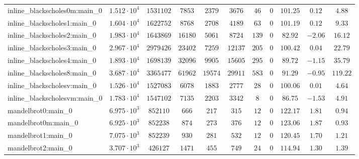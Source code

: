 \begin{tabular}{|l|c|c|c|c|c|c|c|c|c|c|}
inline\_blackscholes0m:main\_0 & $ 1.512 \cdot 10^{4} $ & $ 1531102  $ & $ 7853   $ & $ 2379   $ & $ 3676   $ & $ 46   $ & $ 0    $ & $ 101.25      $ & $ 0.12    $ & $ 4.88    $ \\
inline\_blackscholes1:main\_0  & $ 1.604 \cdot 10^{4} $ & $ 1622752  $ & $ 8768   $ & $ 2708   $ & $ 4189   $ & $ 63   $ & $ 0    $ & $ 101.19      $ & $ 0.12    $ & $ 9.33    $ \\
inline\_blackscholes2:main\_0  & $ 1.983 \cdot 10^{4} $ & $ 1643869  $ & $ 16180  $ & $ 5061   $ & $ 8724   $ & $ 139  $ & $ 0    $ & $ 82.92       $ & $ -2.06   $ & $ 16.12   $ \\
inline\_blackscholes3:main\_0  & $ 2.967 \cdot 10^{4} $ & $ 2979426  $ & $ 23402  $ & $ 7259   $ & $ 12137  $ & $ 205  $ & $ 0    $ & $ 100.42      $ & $ 0.04    $ & $ 22.79   $ \\
inline\_blackscholes4:main\_0  & $ 1.893 \cdot 10^{4} $ & $ 1698139  $ & $ 32096  $ & $ 9905   $ & $ 15605  $ & $ 295  $ & $ 0    $ & $ 89.72       $ & $ -1.15   $ & $ 35.79   $ \\
inline\_blackscholes8:main\_0  & $ 3.687 \cdot 10^{4} $ & $ 3365477  $ & $ 61962  $ & $ 19574  $ & $ 29911  $ & $ 583  $ & $ 0    $ & $ 91.29       $ & $ -0.95   $ & $ 119.22  $ \\
inline\_blackscholesv:main\_0  & $ 1.526 \cdot 10^{4} $ & $ 1527083  $ & $ 6078   $ & $ 1883   $ & $ 2777   $ & $ 28   $ & $ 0    $ & $ 100.06      $ & $ 0.01    $ & $ 4.64    $ \\
inline\_blackscholesvm:main\_0 & $ 1.783 \cdot 10^{4} $ & $ 1547102  $ & $ 7135   $ & $ 2203   $ & $ 3342   $ & $ 8    $ & $ 0    $ & $ 86.75       $ & $ -1.53   $ & $ 4.91    $ \\
mandelbrot0:main\_0            & $ 6.975 \cdot 10^{3} $ & $ 852110   $ & $ 666    $ & $ 217    $ & $ 315    $ & $ 12   $ & $ 0    $ & $ 122.17      $ & $ 1.81    $ & $ 0.94    $ \\
mandelbrot0m:main\_0           & $ 6.925 \cdot 10^{3} $ & $ 852238   $ & $ 874    $ & $ 273    $ & $ 376    $ & $ 12   $ & $ 0    $ & $ 123.06      $ & $ 1.87    $ & $ 0.93    $ \\
mandelbrot1:main\_0            & $ 7.075 \cdot 10^{3} $ & $ 852239   $ & $ 930    $ & $ 281    $ & $ 532    $ & $ 12   $ & $ 0    $ & $ 120.45      $ & $ 1.70    $ & $ 1.21    $ \\
mandelbrot2:main\_0            & $ 3.707 \cdot 10^{3} $ & $ 426127   $ & $ 1471   $ & $ 455    $ & $ 749    $ & $ 24   $ & $ 0    $ & $ 114.94      $ & $ 1.30    $ & $ 1.39    $ \\

\end{tabular}
